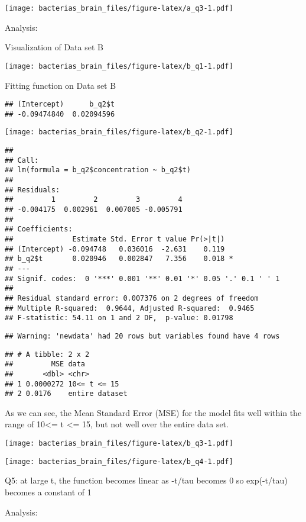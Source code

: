 \documentclass[
]{article}
\begin{document}
\texttt{[image: bacterias\_brain\_files/figure-latex/a\_q3-1.pdf]}

Analysis:

Visualization of Data set B

\texttt{[image: bacterias\_brain\_files/figure-latex/b\_q1-1.pdf]}

Fitting function on Data set B

\begin{verbatim}
## (Intercept)      b_q2$t 
## -0.09474840  0.02094596
\end{verbatim}

\texttt{[image: bacterias\_brain\_files/figure-latex/b\_q2-1.pdf]}

\begin{verbatim}
## 
## Call:
## lm(formula = b_q2$concentration ~ b_q2$t)
## 
## Residuals:
##         1         2         3         4 
## -0.004175  0.002961  0.007005 -0.005791 
## 
## Coefficients:
##              Estimate Std. Error t value Pr(>|t|)  
## (Intercept) -0.094748   0.036016  -2.631    0.119  
## b_q2$t       0.020946   0.002847   7.356    0.018 *
## ---
## Signif. codes:  0 '***' 0.001 '**' 0.01 '*' 0.05 '.' 0.1 ' ' 1
## 
## Residual standard error: 0.007376 on 2 degrees of freedom
## Multiple R-squared:  0.9644, Adjusted R-squared:  0.9465 
## F-statistic: 54.11 on 1 and 2 DF,  p-value: 0.01798
\end{verbatim}

\begin{verbatim}
## Warning: 'newdata' had 20 rows but variables found have 4 rows
\end{verbatim}

\begin{verbatim}
## # A tibble: 2 x 2
##         MSE data          
##       <dbl> <chr>         
## 1 0.0000272 10<= t <= 15  
## 2 0.0176    entire dataset
\end{verbatim}

As we can see, the Mean Standard Error (MSE) for the model fits well
within the range of 10\textless= t \textless= 15, but not well over the
entire data set.

\texttt{[image: bacterias\_brain\_files/figure-latex/b\_q3-1.pdf]}

\texttt{[image: bacterias\_brain\_files/figure-latex/b\_q4-1.pdf]}

Q5: at large t, the function becomes linear as -t/tau becomes 0 so
exp(-t/tau) becomes a constant of 1

Analysis:
\end{document}
